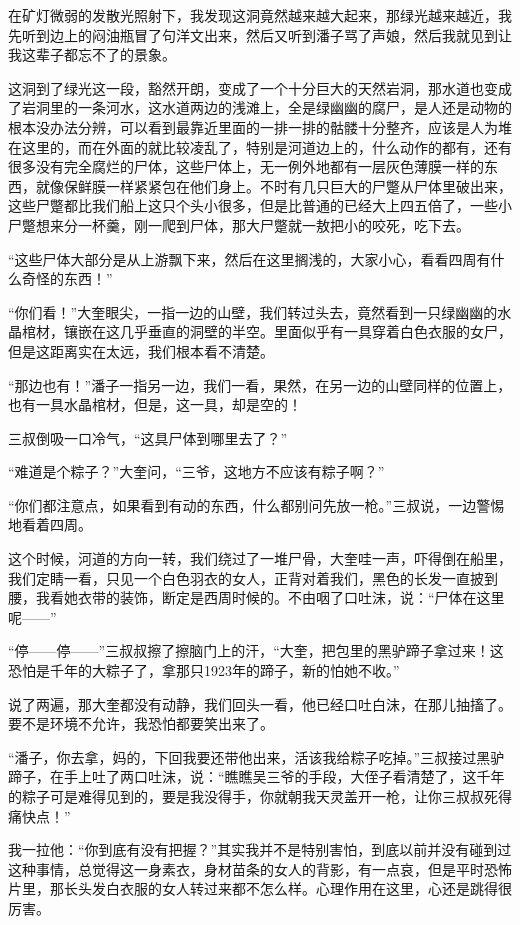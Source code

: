 在矿灯微弱的发散光照射下，我发现这洞竟然越来越大起来，那绿光越来越近，我先听到边上的闷油瓶冒了句洋文出来，然后又听到潘子骂了声娘，然后我就见到让我这辈子都忘不了的景象。

这洞到了绿光这一段，豁然开朗，变成了一个十分巨大的天然岩洞，那水道也变成了岩洞里的一条河水，这水道两边的浅滩上，全是绿幽幽的腐尸，是人还是动物的根本没办法分辨，可以看到最靠近里面的一排一排的骷髅十分整齐，应该是人为堆在这里的，而在外面的就比较凌乱了，特别是河道边上的，什么动作的都有，还有很多没有完全腐烂的尸体，这些尸体上，无一例外地都有一层灰色薄膜一样的东西，就像保鲜膜一样紧紧包在他们身上。不时有几只巨大的尸蹩从尸体里破出来，这些尸蹩都比我们船上这只个头小很多，但是比普通的已经大上四五倍了，一些小尸蹩想来分一杯羹，刚一爬到尸体，那大尸蹩就一敖把小的咬死，吃下去。

“这些尸体大部分是从上游飘下来，然后在这里搁浅的，大家小心，看看四周有什么奇怪的东西！”

“你们看！”大奎眼尖，一指一边的山壁，我们转过头去，竟然看到一只绿幽幽的水晶棺材，镶嵌在这几乎垂直的洞壁的半空。里面似乎有一具穿着白色衣服的女尸，但是这距离实在太远，我们根本看不清楚。

“那边也有！”潘子一指另一边，我们一看，果然，在另一边的山壁同样的位置上，也有一具水晶棺材，但是，这一具，却是空的！

三叔倒吸一口冷气，“这具尸体到哪里去了？”

“难道是个粽子？”大奎问，“三爷，这地方不应该有粽子啊？”

“你们都注意点，如果看到有动的东西，什么都别问先放一枪。”三叔说，一边警惕地看着四周。

这个时候，河道的方向一转，我们绕过了一堆尸骨，大奎哇一声，吓得倒在船里，我们定睛一看，只见一个白色羽衣的女人，正背对着我们，黑色的长发一直披到腰，我看她衣带的装饰，断定是西周时候的。不由咽了口吐沫，说：“尸体在这里呢——”

“停——停——”三叔叔擦了擦脑门上的汗，“大奎，把包里的黑驴蹄子拿过来！这恐怕是千年的大粽子了，拿那只1923年的蹄子，新的怕她不收。”

说了两遍，那大奎都没有动静，我们回头一看，他已经口吐白沫，在那儿抽搐了。要不是环境不允许，我恐怕都要笑出来了。

“潘子，你去拿，妈的，下回我要还带他出来，活该我给粽子吃掉。”三叔接过黑驴蹄子，在手上吐了两口吐沫，说：“瞧瞧吴三爷的手段，大侄子看清楚了，这千年的粽子可是难得见到的，要是我没得手，你就朝我天灵盖开一枪，让你三叔叔死得痛快点！”

我一拉他：“你到底有没有把握？”其实我并不是特别害怕，到底以前并没有碰到过这种事情，总觉得这一身素衣，身材苗条的女人的背影，有一点哀，但是平时恐怖片里，那长头发白衣服的女人转过来都不怎么样。心理作用在这里，心还是跳得很厉害。

